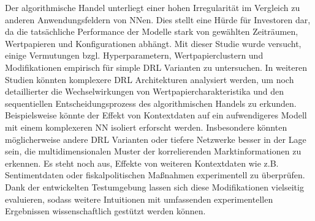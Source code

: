 Der algorithmische Handel unterliegt einer hohen Irregularität im Vergleich zu anderen Anwendungsfeldern von \acs{NN}en. 
Dies stellt eine Hürde für Investoren dar, da die tatsächliche Performance der Modelle stark von gewählten Zeiträumen, Wertpapieren und Konfigurationen abhängt.
Mit dieser Studie wurde versucht, einige Vermutungen bzgl. Hyperparametern, Wertpapierclustern und Modifikationen empirisch für simple \acs{DRL} Varianten zu untersuchen.
In weiteren Studien könnten komplexere \acs{DRL} Architekturen analysiert werden, um noch detaillierter die Wechselwirkungen von Wertpapiercharakteristika und den sequentiellen Entscheidungsprozess des algorithmischen Handels zu erkunden.
Beispielsweise könnte der Effekt von Kontextdaten auf ein aufwendigeres Modell mit einem komplexeren \acs{NN} isoliert erforscht werden.
Insbesondere könnten möglicherweise andere \acs{DRL} Varianten oder tiefere Netzwerke besser in der Lage sein, die multidimensionalen Muster der korrelierenden Marktinformationen zu erkennen. Es steht noch aus, Effekte von weiteren Kontextdaten wie z.B. Sentimentdaten oder fiskalpolitischen Maßnahmen experimentell zu überprüfen.
Dank der entwickelten Testumgebung lassen sich diese Modifikationen vielseitig evaluieren, sodass weitere Intuitionen mit umfassenden experimentellen Ergebnissen wissenschaftlich gestützt werden können.

